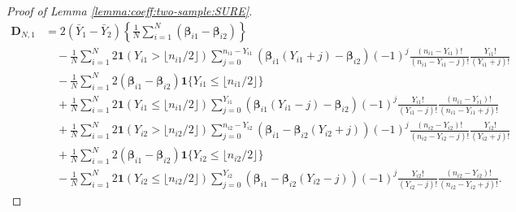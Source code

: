 \documentclass[12pt,letterpaper]{article}
\begin{document}
\begin{proof}[Proof of Lemma \ref{lemma:coeff:two-sample:SURE}]
\begin{equation}\label{eq:coefficient:linear:ML:two-sample}
\begin{array}{rl}
    \mathbf{D}_{N,1}\!\!\!\!\!\!&\displaystyle=2(\bar{Y}_1-\bar{Y}_2)\left\{\frac{1}{N}\sum_{i=1}^N(\boldsymbol{\beta}_{i1}-\boldsymbol{\beta}_{i2})\right\}\\
    &\displaystyle\quad-\frac{1}{N}\sum_{i=1}^N2\mathbf{1}(Y_{i1} > \lfloor n_{i1}/2\rfloor)\!\!\!\sum_{j=0}^{n_{i1}-Y_{i1}}\!\!\!(\boldsymbol{\beta}_{i1}(Y_{i1}+j)-\boldsymbol{\beta}_{i2})(-1)^{j}\frac{(n_{i1}-Y_{i1})!}{(n_{i1}-Y_{i1}-j)!}\frac{Y_{i1}!}{(Y_{i1}+j)!}\\
    &\quad\displaystyle-\frac{1}{N}\sum_{i=1}^N2(\boldsymbol{\beta}_{i1}-\boldsymbol{\beta}_{i2})\mathbf{1}\{Y_{i1}\leq \lfloor n_{i1}/2\rfloor\}\\
    &\quad\displaystyle+\frac{1}{N}\sum_{i=1}^N2\mathbf{1}(Y_{i1}\leq \lfloor n_{i1}/2\rfloor)\sum_{j=0}^{Y_{i1}}(\boldsymbol{\beta}_{i1}(Y_{i1}-j)-\boldsymbol{\beta}_{i2})(-1)^{j}\frac{Y_{i1}!}{(Y_{i1}-j)!}\frac{(n_{i1} - Y_{i1})!}{(n_{i1}-Y_{i1}+j)!}\\
    &\displaystyle\quad+\frac{1}{N}\sum_{i=1}^N2\mathbf{1}(Y_{i2} > \lfloor n_{i2}/2\rfloor)\!\!\!\sum_{j=0}^{n_{i2}-Y_{i2}}\!\!\!(\boldsymbol{\beta}_{i1}-\boldsymbol{\beta}_{i2}(Y_{i2}+j))(-1)^{j}\frac{(n_{i2}-Y_{i2})!}{(n_{i2}-Y_{i2}-j)!}\frac{Y_{i2}!}{(Y_{i2}+j)!}\\
    &\quad\displaystyle+\frac{1}{N}\sum_{i=1}^N2(\boldsymbol{\beta}_{i1}-\boldsymbol{\beta}_{i2})\mathbf{1}\{Y_{i2}\leq \lfloor n_{i2}/2\rfloor\}\\
    &\quad\displaystyle-\frac{1}{N}\sum_{i=1}^N2\mathbf{1}(Y_{i2}\leq \lfloor n_{i2}/2\rfloor)\sum_{j=0}^{Y_{i2}}(\boldsymbol{\beta}_{i1}-\boldsymbol{\beta}_{i2}(Y_{i2}-j))(-1)^{j}\frac{Y_{i2}!}{(Y_{i2}-j)!}\frac{(n_{i2} - Y_{i2})!}{(n_{i2}-Y_{i2}+j)!}.
\end{array}
\end{equation}
\end{proof}
\end{document}
